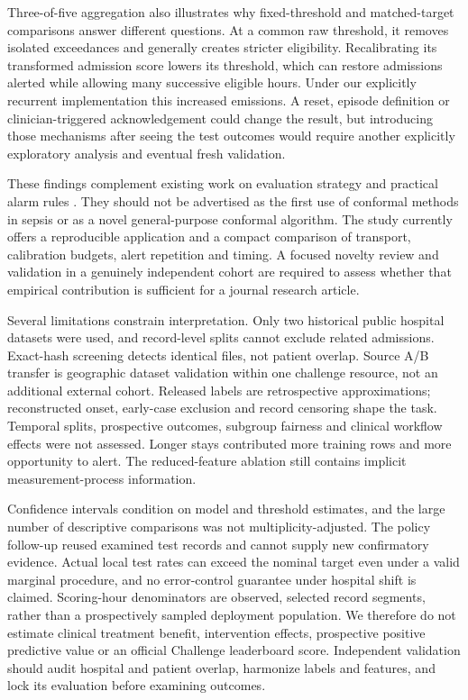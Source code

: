 \documentclass[11pt,a4paper]{article}
\begin{document}
Three-of-five aggregation also illustrates why fixed-threshold and matched-target comparisons answer different questions. At a common raw threshold, it removes isolated exceedances and generally creates stricter eligibility. Recalibrating its transformed admission score lowers its threshold, which can restore admissions alerted while allowing many successive eligible hours. Under our explicitly recurrent implementation this increased emissions. A reset, episode definition or clinician-triggered acknowledgement could change the result, but introducing those mechanisms after seeing the test outcomes would require another explicitly exploratory analysis and eventual fresh validation.

These findings complement existing work on evaluation strategy and practical alarm rules \cite{do,moor,composer,gupta}. They should not be advertised as the first use of conformal methods in sepsis or as a novel general-purpose conformal algorithm. The study currently offers a reproducible application and a compact comparison of transport, calibration budgets, alert repetition and timing. A focused novelty review and validation in a genuinely independent cohort are required to assess whether that empirical contribution is sufficient for a journal research article.

Several limitations constrain interpretation. Only two historical public hospital datasets were used, and record-level splits cannot exclude related admissions. Exact-hash screening detects identical files, not patient overlap. Source A/B transfer is geographic dataset validation within one challenge resource, not an additional external cohort. Released labels are retrospective approximations; reconstructed onset, early-case exclusion and record censoring shape the task. Temporal splits, prospective outcomes, subgroup fairness and clinical workflow effects were not assessed. Longer stays contributed more training rows and more opportunity to alert. The reduced-feature ablation still contains implicit measurement-process information.

Confidence intervals condition on model and threshold estimates, and the large number of descriptive comparisons was not multiplicity-adjusted. The policy follow-up reused examined test records and cannot supply new confirmatory evidence. Actual local test rates can exceed the nominal target even under a valid marginal procedure, and no error-control guarantee under hospital shift is claimed. Scoring-hour denominators are observed, selected record segments, rather than a prospectively sampled deployment population. We therefore do not estimate clinical treatment benefit, intervention effects, prospective positive predictive value or an official Challenge leaderboard score. Independent validation should audit hospital and patient overlap, harmonize labels and features, and lock its evaluation before examining outcomes.
\end{document}

